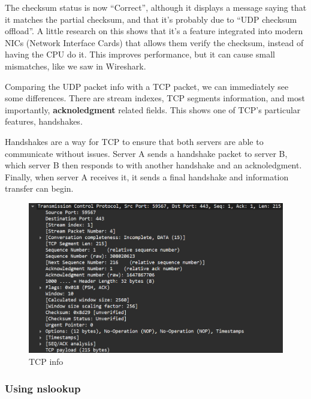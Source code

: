 The checksum status is now ``Correct'', although it displays a message saying
that it matches the partial checksum, and that it's probably due to ``UDP
checksum offload''. A little research on this shows that it's a feature
integrated into modern NICs (Network Interface Cards) that allows them verify
the checksum, instead of having the CPU do it. This improves performance, but
it can cause small mismatches, like we saw in Wireshark.

Comparing the UDP packet info with a TCP packet, we can immediately see some
differences. There are stream indexes, TCP segments information, and most
importantly, \textbf{acknoledgment} related fields. This shows one of TCP's
particular features, handshakes.

Handshakes are a way for TCP to ensure that both servers are able to
communicate without issues. Server A sends a handshake packet to server B,
which server B then responds to with another handshake and an acknoledgment.
Finally, when server A receives it, it sends a final handshake and information
transfer can begin.

\begin{figure}[htbp]
    \centering
    \includegraphics[width=1\linewidth]{img/6.png}
    \caption{TCP info}\label{fig:6}
\end{figure}

\subsubsection{Using nslookup}

